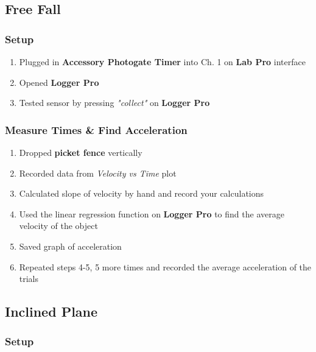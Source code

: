 \documentclass[a4paper,12pt]{article}
\begin{document}
\subsection{Free Fall}

\subsubsection{Setup}

	\begin{enumerate}

		\item Plugged in \textbf{Accessory Photogate Timer} into Ch. 1 on \textbf{Lab Pro} interface
		\item Opened \textbf{Logger Pro}
			
		\item Tested sensor by pressing \textit{"collect"} on \textbf{Logger Pro}
	\end{enumerate}	

\subsubsection{Measure Times \& Find Acceleration}
	\begin{enumerate}[resume]

		\item Dropped \textbf{picket fence} vertically
	
		\item Recorded data from \textit{Velocity vs Time} plot

		\item Calculated slope of velocity by hand and record your calculations

		\item Used the linear regression function on \textbf{Logger Pro} to find the average velocity of the object

		\item Saved graph of acceleration

		\item Repeated steps 4-5, 5 more times and recorded the average acceleration of the trials
	\end{enumerate}

\subsection{Inclined Plane}

\subsubsection{Setup}
\end{document}
